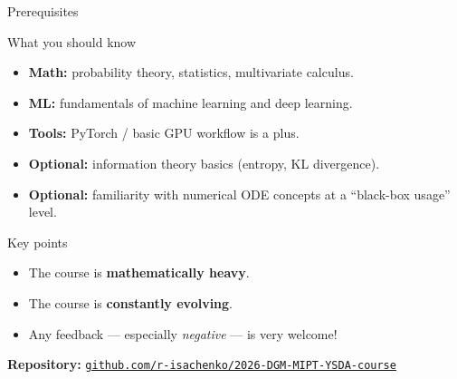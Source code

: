\documentclass{beamer}
\renewcommand{\eqpause}{}
\begin{document}
\begin{frame}{Prerequisites}
    \begin{block}{What you should know}
        \begin{itemize}
            \setlength{\itemsep}{0.1em}
            \item \textbf{Math:} probability theory, statistics, multivariate calculus.
            \item \textbf{ML:} fundamentals of machine learning and deep learning.
            \item \textbf{Tools:} PyTorch / basic GPU workflow is a plus.
            \item \textbf{Optional:} information theory basics (entropy, KL divergence).
            \item \textbf{Optional:} familiarity with numerical ODE concepts at a ``black-box usage'' level.
        \end{itemize}
    \end{block}
    \eqpause
    \begin{block}{Key points}
        \begin{itemize}
            \setlength{\itemsep}{0.1em}
            \item The course is \textbf{mathematically heavy}.
            \item The course is \textbf{constantly evolving}.
            \item Any feedback --- especially \emph{negative} --- is very welcome!
        \end{itemize}
    \end{block}
    \eqpause
    \begin{center}
        \textbf{Repository:}\;\; \href{https://github.com/r-isachenko/2026-DGM-MIPT-YSDA-course}{\texttt{github.com/r-isachenko/2026-DGM-MIPT-YSDA-course}}
    \end{center}
\end{frame}
\end{document}
